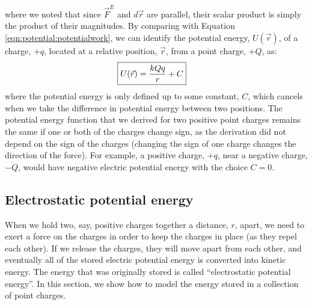 where we noted that since $\vec F^E$ and $d\vec r$ are parallel, their scalar product is simply the product of their magnitudes. By comparing with Equation \ref{eqn:potential:potentialwork}, we can identify the potential energy, $U(\vec r)$, of a charge, $+q$, located at a relative position, $\vec r$, from a point charge, $+Q$, as:
\begin{align*}
\Aboxed{U(\vec r)=\frac{kQq}{r}+C}
\end{align*}
where the potential energy is only defined up to some constant, $C$, which cancels when we take the difference in potential energy between two positions. The potential energy function that we derived for two positive point charges remains the same if one or both of the charges change sign, as the derivation did not depend on the sign of the charges (changing the sign of one charge changes the direction of the force). For example, a positive charge, $+q$, near a negative charge, $-Q$, would have negative electric potential energy with the choice $C=0$. 

\subsection{Electrostatic potential energy}
When we hold two, say, positive charges together a distance, $r$, apart, we need to exert a force on the charges in order to keep the charges in place (as they repel each other). If we release the charges, they will move apart from each other, and eventually all of the stored electric potential energy is converted into kinetic energy. The energy that was originally stored is called ``electrostatic potential energy''. In this section, we show how to model the energy stored in a collection of point charges.

